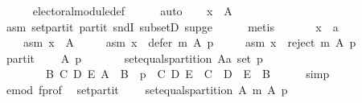 \begin{isabellebody}
\ \ \ \ \isamarkupfalse%
\ electoral{\isacharunderscore}{\kern0pt}module{\isacharunderscore}{\kern0pt}def\isanewline
\ \ \ \ \isamarkupfalse%
\ auto\isanewline
\ \ \isamarkupfalse%
\ {\isachardoublequoteopen}x\ {\isasymin}\ A{\isachardoublequoteclose}\isanewline
\ \ \ \ \isamarkupfalse%
\ asm\ set{\isacharunderscore}{\kern0pt}partit\ partit\ sndI\ subsetD\ sup{\isacharunderscore}{\kern0pt}ge{}\isanewline
\ \ \ \ \isamarkupfalse%
\ metis\isanewline
{}\isamarkupfalse%
\isanewline
\ \ \isamarkupfalse%
\isanewline
\ \ \ \ x\ {\isacharcolon}{\kern0pt}{\isacharcolon}{\kern0pt}\ {\isachardoublequoteopen}{\isacharprime}{\kern0pt}a{\isachardoublequoteclose}\isanewline
\ \ \isamarkupfalse%
\isanewline
\ \ \ \ asm{}{\isacharcolon}{\kern0pt}\ {\isachardoublequoteopen}x\ {\isasymin}\ A{\isachardoublequoteclose}\ \isanewline
\ \ \ \ asm{}{\isacharcolon}{\kern0pt}\ {\isachardoublequoteopen}x\ {\isasymnotin}\ defer\ m\ A\ p{\isachardoublequoteclose}\ \isanewline
\ \ \ \ asm{}{\isacharcolon}{\kern0pt}\ {\isachardoublequoteopen}x\ {\isasymnotin}\ reject\ m\ A\ p{\isachardoublequoteclose}\isanewline
\ \ \isamarkupfalse%
\ partit{\isacharcolon}{\kern0pt}\isanewline
\ \ \ \ {\isachardoublequoteopen}{\isasymforall}A\ p{\isachardot}{\kern0pt}\isanewline
\ \ \ \ \ \ {\isasymnot}\ set{\isacharunderscore}{\kern0pt}equals{\isacharunderscore}{\kern0pt}partition\ {\isacharparenleft}{\kern0pt}A{\isacharcolon}{\kern0pt}{\isacharcolon}{\kern0pt}{\isacharprime}{\kern0pt}a\ set{\isacharparenright}{\kern0pt}\ p\ {\isasymor}\isanewline
\ \ \ \ \ \ \ \ {\isacharparenleft}{\kern0pt}{\isasymexists}B\ C\ D\ E{\isachardot}{\kern0pt}\ A\ {\isacharequal}{\kern0pt}\ B\ {\isasymand}\ p\ {\isacharequal}{\kern0pt}\ {\isacharparenleft}{\kern0pt}C{\isacharcomma}{\kern0pt}\ D{\isacharcomma}{\kern0pt}\ E{\isacharparenright}{\kern0pt}\ {\isasymand}\ C\ {\isasymunion}\ D\ {\isasymunion}\ E\ {\isacharequal}{\kern0pt}\ B{\isacharparenright}{\kern0pt}{\isachardoublequoteclose}\isanewline
\ \ \ \ \isamarkupfalse%
\ simp\isanewline
\ \ \isamarkupfalse%
\ e{\isacharunderscore}{\kern0pt}mod\ f{\isacharunderscore}{\kern0pt}prof\ \isamarkupfalse%
\ set{\isacharunderscore}{\kern0pt}partit{\isacharcolon}{\kern0pt}\isanewline
\ \ \ \ {\isachardoublequoteopen}set{\isacharunderscore}{\kern0pt}equals{\isacharunderscore}{\kern0pt}partition\ A\ {\isacharparenleft}{\kern0pt}m\ A\ p{\isacharparenright}{\kern0pt}{\isachardoublequoteclose}\isanewline

\end{isabellebody}
